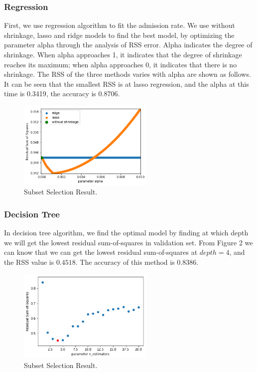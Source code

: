 \documentclass{article}
\begin{document}
\subsubsection{Regression}
First, we use regression algorithm to fit the admission rate. We use without shrinkage, lasso and ridge models to find the best model, by optimizing the parameter alpha through the analysis of RSS error. Alpha indicates the degree of shrinkage. When alpha approaches 1, it indicates that the degree of shrinkage reaches its maximum; when alpha approaches 0, it indicates that there is no shrinkage.
The RSS of the three methods varies with alpha are shown as follows. It can be seen that the smallest RSS is at lasso regression, and the alpha at this time is 0.3419, the accuracy is 0.8706.
\begin{figure}[h]
	\centering
	\includegraphics[width=6.5cm]{linear_regression.jpg}
	\caption{Subset Selection Result.}
\end{figure}

\subsubsection{Decision Tree}
In decision tree algorithm, we find the optimal model by finding at which depth we will get the lowest residual sum-of-squares in validation set.
From Figure 2 we can know that we can get the lowest residual sum-of-squares at $depth = 4$, and the RSS value is $0.4518$. The accuracy of this method is $0.8386$.
\begin{figure}[h]
	\centering
	\includegraphics[width=6.5cm]{decision_tree.jpg}
	\caption{Subset Selection Result.}
\end{figure}
\end{document}
